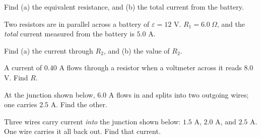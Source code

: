 \documentclass[12pt]{article}
\newcommand{\battv}[1]{%
  \draw[line width=0.7pt] ($(#1)+(0,0.55)$) -- ($(#1)+(0,0.12)$);
  \draw[line width=0.7pt] ($(#1)+(0,-0.12)$) -- ($(#1)+(0,-0.55)$);
  \draw[line width=1.1pt] ($(#1)+(-0.35,0.12)$) -- ($(#1)+(0.35,0.12)$);
  \draw[line width=2.4pt] ($(#1)+(-0.2,-0.12)$) -- ($(#1)+(0.2,-0.12)$);
  \node[scale=0.75] at ($(#1)+(0.6,0.12)$) {$+$};
  \node[scale=0.75] at ($(#1)+(0.6,-0.12)$) {$-$};
}
\newcommand{\reszig}[1]{%
  \fill[white] ($(#1)+(-0.65,-0.32)$) rectangle ($(#1)+(0.65,0.32)$);
  \draw ($(#1)+(-0.6,0)$)
    -- ($(#1)+(-0.42,0.22)$) -- ($(#1)+(-0.24,-0.22)$)
    -- ($(#1)+(-0.06,0.22)$) -- ($(#1)+(0.12,-0.22)$)
    -- ($(#1)+(0.3,0.22)$) -- ($(#1)+(0.48,-0.22)$)
    -- ($(#1)+(0.6,0)$);
}
\newcommand{\jarrow}[3]{%
  \ifstrequal{#2}{in}{%
    \draw[-{Stealth[length=3mm]}, line width=1pt] (#1:1.5) -- (0,0);
  }{%
    \draw[-{Stealth[length=3mm]}, line width=1pt] (0,0) -- (#1:1.5);
  }%
  \node[scale=0.85] at (#1:1.95) {#3};%
}
\begin{document}
\noindent Find (a) the equivalent resistance, and (b) the total current
from the battery.


\prob Two resistors are in parallel across a battery of $\varepsilon=12$
V. $R_1=6.0\ \Omega$, and the \emph{total} current measured from the
battery is $5.0$ A.

\begin{center}
\end{center}

\noindent Find (a) the current through $R_2$, and (b) the value
of $R_2$.



\prob A current of $0.40$ A flows through a resistor when a voltmeter
across it reads $8.0$ V. Find $R$.


\prob At the junction shown below, $6.0$ A flows in and splits into two
outgoing wires; one carries $2.5$ A. Find the other.

\begin{center}
\end{center}


\prob Three wires carry current \emph{into} the junction shown below:
$1.5$ A, $2.0$ A, and $2.5$ A. One wire carries it all back out. Find that
current.

\begin{center}
\end{center}
\end{document}
